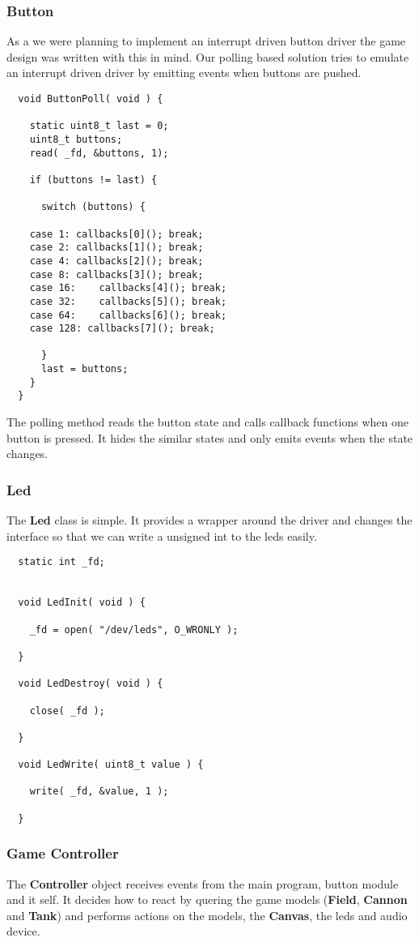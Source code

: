 \subsubsection{Button}
As a we were planning to implement an interrupt driven button driver the game design
was written with this in mind. Our polling based solution tries to emulate an interrupt
driven driver by emitting events when buttons are pushed.

\begin{lstlisting}
  void ButtonPoll( void ) {

    static uint8_t last = 0;
    uint8_t buttons;
    read( _fd, &buttons, 1);

    if (buttons != last) {

      switch (buttons) {

	case 1:	callbacks[0](); break;
	case 2:	callbacks[1](); break;
	case 4:	callbacks[2](); break;
	case 8:	callbacks[3](); break;
	case 16:	callbacks[4](); break;
	case 32:	callbacks[5](); break;
	case 64:	callbacks[6](); break;
	case 128: callbacks[7](); break;

      }
      last = buttons;
    }
  }
\end{lstlisting}
The polling method reads the button state and calls callback functions when one button
is pressed. It hides the similar states and only emits events when the state changes.

\subsubsection{Led}
The {\bf Led} class is simple. It provides a wrapper around the driver and changes the interface
so that we can write a unsigned int to the leds easily.
\begin{lstlisting}
  static int _fd;


  void LedInit( void ) {

    _fd = open( "/dev/leds", O_WRONLY );

  }

  void LedDestroy( void ) {

    close( _fd );

  }

  void LedWrite( uint8_t value ) {

    write( _fd, &value, 1 );

  }

\end{lstlisting}


\subsubsection{Game Controller}
The {\bf Controller} object receives events from the main program, button module and it self.
It decides how to react by quering the game models ({\bf Field}, {\bf Cannon} and {\bf Tank})
and performs actions on the models, the {\bf Canvas}, the leds and audio device.

